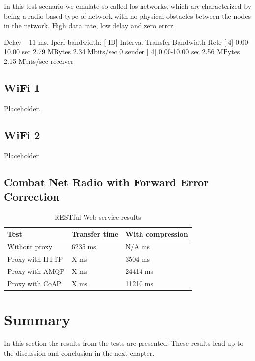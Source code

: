 In this test scenario we emulate so-called \gls{los} networks, which are
characterized by being a radio-based type of network with no physical obstacles
between the nodes in the network. High data rate, low delay and zero error.

Delay ~ 11 ms.
Iperf bandwidth:
[ ID] Interval           Transfer     Bandwidth       Retr
[  4]   0.00-10.00  sec  2.79 MBytes  2.34 Mbits/sec    0             sender
[  4]   0.00-10.00  sec  2.56 MBytes  2.15 Mbits/sec                  receiver

\subsection{WiFi 1}

Placeholder.


\subsection{WiFi 2}

Placeholder

\subsection{Combat Net Radio with Forward Error Correction}

\begin{table}[h!]
\begin{tabular}{| l | l | l |}
\hline
  \textbf{Test} & \textbf{Transfer time} & \textbf{With compression}\\ \hline
  Without proxy & 6235 ms & N/A ms \\ \hline
  Proxy with HTTP & X ms & 3504 ms \\ \hline
  Proxy with AMQP & X ms & 24414 ms \\ \hline
  Proxy with CoAP & X ms & 11210 ms \\ \hline
\end{tabular}
\caption{RESTful Web service results}
\end{table}

\section{Summary}

In this section the results from the tests are presented. These results lead up
to the discussion and conclusion in the next chapter.
